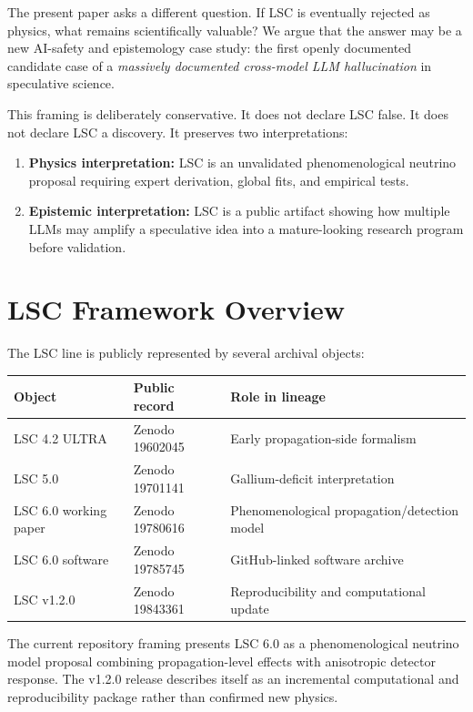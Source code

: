 \documentclass[11pt,a4paper]{article}
\begin{document}
The present paper asks a different question. If LSC is eventually rejected as physics, what remains scientifically valuable? We argue that the answer may be a new AI-safety and epistemology case study: the first openly documented candidate case of a \emph{massively documented cross-model LLM hallucination} in speculative science.

This framing is deliberately conservative. It does not declare LSC false. It does not declare LSC a discovery. It preserves two interpretations:

\begin{enumerate}
  \item \textbf{Physics interpretation:} LSC is an unvalidated phenomenological neutrino proposal requiring expert derivation, global fits, and empirical tests.
  \item \textbf{Epistemic interpretation:} LSC is a public artifact showing how multiple LLMs may amplify a speculative idea into a mature-looking research program before validation.
\end{enumerate}

\section{LSC Framework Overview}

The LSC line is publicly represented by several archival objects:

\begin{center}
\begin{tabular}{lll}
\toprule
Object & Public record & Role in lineage \\
\midrule
LSC 4.2 ULTRA & Zenodo 19602045 & Early propagation-side formalism \\
LSC 5.0 & Zenodo 19701141 & Gallium-deficit interpretation \\
LSC 6.0 working paper & Zenodo 19780616 & Phenomenological propagation/detection model \\
LSC 6.0 software & Zenodo 19785745 & GitHub-linked software archive \\
LSC v1.2.0 & Zenodo 19843361 & Reproducibility and computational update \\
\bottomrule
\end{tabular}
\end{center}

The current repository framing presents LSC 6.0 as a phenomenological neutrino model proposal combining propagation-level effects with anisotropic detector response. The v1.2.0 release describes itself as an incremental computational and reproducibility package rather than confirmed new physics.
\end{document}
